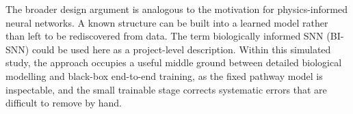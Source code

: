 The broader design argument is analogous to the motivation for physics-informed neural networks. A known structure can be built into a learned model rather than left to be rediscovered from data. The term biologically informed SNN (BI-SNN) could be used here as a project-level description. Within this simulated study, the approach occupies a useful middle ground between detailed biological modelling and black-box end-to-end training, as the fixed pathway model is inspectable, and the small trainable stage corrects systematic errors that are difficult to remove by hand.
